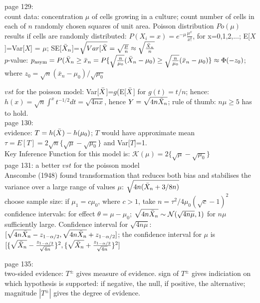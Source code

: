 page 129:\\
count data: concentration $\mu$ of cells growing in a culture; count number of cells in each of $n$ randomly chosen squares of unit area. Poisson distribution $Po(\mu)$ results if cells are randomly distributed: $P(X_i = x) = e^{-\mu}\frac{\mu^x}{x!}$, for x=0,1,2,...; E[$X$]=Var[$X$] = $\mu$; SE[$\Bar{X}_n$]=$\sqrt{Var[\Bar{X}}=\sqrt{\frac{\mu}{n}}\approx \sqrt{\frac{\Bar{X}_n}{n}}$\\
$p$-value: $p_{\text{asym}} = P(\Bar{X}_n\geq \Bar{x}_n = P\{\sqrt{\frac{n}{\mu_0}}(\Bar{X}_n-\mu_0)\geq \sqrt{\frac{n}{\mu_0}}(\Bar{x}_n-\mu_0)\} \approx \Phi(-z_0)$; where $z_0 = \sqrt{n}(\bar{x}_n-\mu_0)/\sqrt{\mu_0}$

$vst$ for the poisson model: Var[$\Bar{X}$]=$g$(E[$\Bar{X}$] for $g(t)=t/n$; hence: $h(x)=\sqrt{n}\int^x t^{-1/2} dt = \sqrt{4nx}$, hence $Y = \sqrt{4n\Bar{X}_n}$; rule of thumb: $n\mu \geq 5$ has to hold.\\

page 130:\\
evidence: $T=h(\Bar{X})-h(\mu_0)$; $T$ would have approximate mean $\tau = E[T]=2\sqrt{n}\{\sqrt{\mu}-\sqrt{\mu_0}\}$ and Var[$T$]=1.\\
Key Inference Function for this model is: $\mathcal{K}(\mu)=2\{\sqrt{\mu}-\sqrt{\mu_0}\}$\\

page 131: a better $vst$ for the poisson model\\
Anscombe (1948) found transformation that reduces both bias and stabilises the variance over a large range of values $\mu$: $\sqrt{4n(\Bar{X}_n + 3/8n)}$\\
choose sample size: if $\mu_1 = c\mu_0$, where $c > 1$, take $n = \tau^2/4\mu_0(\sqrt{c}-1)^2$\\
confidence intervals: for effect $\theta = \mu - \mu_0$; $\sqrt{4n\Bar{X}_n} \sim \mathcal{N}(\sqrt{4n\mu},1)$ for $n\mu$ sufficiently large. Confidence interval for $\sqrt{4n\mu}$: $[\sqrt{4n\Bar{X}_n}-z_{1-\alpha/2},\sqrt{4n\Bar{X}_n}+z_{1-\alpha/2}]$; the confidence interval for $\mu$ is $[\{\sqrt{\Bar{X}_n}-\frac{z_{1-\alpha/2}}{\sqrt{4n}}\}^2,\{\sqrt{\Bar{X}_n}+\frac{z_{1-\alpha/2}}{\sqrt{4n}}\}^2]$

page 135:\\
two-sided evidence: $T^{\pm}$ gives measure of evidence. sign of $T^{\pm}$ gives indiciation on which hypothesis is supported: if negative, the null, if positive, the alternative; magnitude $|T^{\pm}|$ gives the degree of evidence.\\

